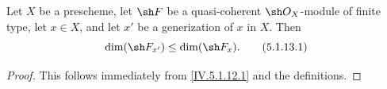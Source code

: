 \begin{proposition}[5.1.13]
\label{IV.5.1.13}
Let $X$ be a prescheme, let $\sh F$ be a quasi-coherent
$\sh O_X$-module of finite type, let $x\in X$, and let $x'$ be a
generization of $x$ in $X$. Then
\begin{equation}
\dim(\sh F_{x'})\leq\dim(\sh F_x).
\tag{5.1.13.1}\label{IV.5.1.13.1}
\end{equation}
\end{proposition}

\begin{proof}
This follows immediately from \eqref{IV.5.1.12.1} and the
definitions.
\end{proof}
